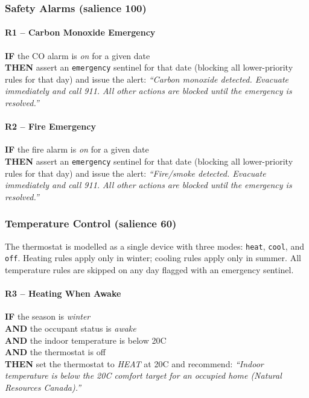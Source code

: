 \documentclass{article}
\begin{document}
\subsubsection{Safety Alarms \textnormal{\small(salience 100)}}

\paragraph{R1 -- Carbon Monoxide Emergency}
\textbf{IF} the CO alarm is \emph{on} for a given date \\
\textbf{THEN} assert an \texttt{emergency} sentinel for that date (blocking all lower-priority rules for that day) and issue the alert: \textit{``Carbon monoxide detected. Evacuate immediately and call 911. All other actions are blocked until the emergency is resolved.''}

\paragraph{R2 -- Fire Emergency}
\textbf{IF} the fire alarm is \emph{on} for a given date \\
\textbf{THEN} assert an \texttt{emergency} sentinel for that date (blocking all lower-priority rules for that day) and issue the alert: \textit{``Fire/smoke detected. Evacuate immediately and call 911. All other actions are blocked until the emergency is resolved.''}

\subsubsection{Temperature Control \textnormal{\small(salience 60)}}

The thermostat is modelled as a single device with three modes: \texttt{heat}, \texttt{cool}, and \texttt{off}. Heating rules apply only in winter; cooling rules apply only in summer. All temperature rules are skipped on any day flagged with an emergency sentinel.

\paragraph{R3 -- Heating When Awake}
\textbf{IF} the season is \emph{winter} \\
\textbf{AND} the occupant status is \emph{awake} \\
\textbf{AND} the indoor temperature is below 20\textdegree C \\
\textbf{AND} the thermostat is off \\
\textbf{THEN} set the thermostat to \emph{HEAT} at 20\textdegree C and recommend: \textit{``Indoor temperature is below the 20\textdegree C comfort target for an occupied home (Natural Resources Canada).''}
\end{document}
